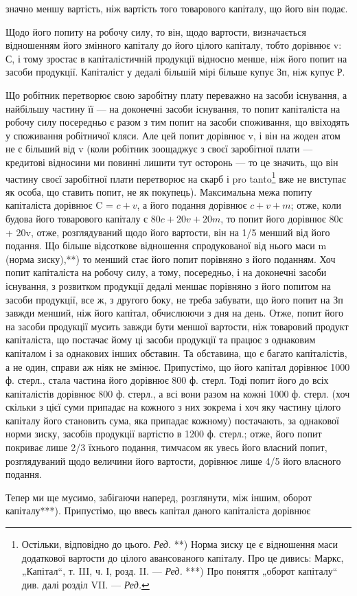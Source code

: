 \parcont{}  %
значно меншу вартість, ніж вартість того товарового капіталу, що
його він подає.

Щодо його попиту на робочу силу, то він, щодо вартости, визначається
відношенням його змінного капіталу до його цілого капіталу,
тобто дорівнює v: С, і тому зростає в капіталістичній продукції
відносно менше, ніж його попит на засоби продукції. Капіталіст
у дедалі більшій мірі більше купує Зп, ніж купує Р.

Що робітник перетворює свою заробітну плату переважно на засоби
існування, а найбільшу частину її — на доконечні засоби існування, то попит
капіталіста на робочу силу посередньо є разом з тим попит на засоби споживання,
що ввіходять у споживання робітничої кляси. Але цей попит
дорівнює v, і він на жоден атом не є більший від v (коли робітник зоощаджує
з своєї заробітної плати — кредитові відносини ми повинні лишити
тут осторонь — то це значить, що він частину своєї заробітної плати
перетворює на скарб і pro tanto\footnote*{
Остільки, відповідно до цього. \emph{Ред.}
**) Норма зиску це є відношення маси додаткової вартости до цілого авансованого
капіталу. Про це дивись: Маркс, „Капітал“, т. III, ч. І, розд. II. —
\emph{Ред.}
***) Про поняття „оборот капіталу“ див. далі розділ VII. — \emph{Ред.}
} вже не виступає як особа, що ставить
попит, не як покупець). Максимальна межа попиту капіталіста дорівнює
C = $c + v$, а його подання дорівнює $c + v + m$; отже, коли будова
його товарового капіталу є $80c + 20v + 20m$, то попит його дорівнює
80с + 20v, отже, розглядуваний щодо його вартости, він на 1/5 менший
від його подання. Що більше відсоткове відношення спродукованої від нього
маси m (норма зиску),**) то менший стає його попит порівняно з його
поданням. Хоч попит капіталіста на робочу силу, а тому, посередньо, і
на доконечні засоби існування, з розвитком продукції дедалі меншає порівняно
з його попитом на засоби продукції, все ж, з другого боку, не
треба забувати, що його попит на Зп завжди менший, ніж його капітал,
обчислюючи з дня на день. Отже, попит його на засоби продукції
мусить завжди бути меншої вартости, ніж товаровий продукт капіталіста,
що постачає йому ці засоби продукції та працює з однаковим
капіталом і за однакових інших обставин. Та обставина, що є
багато капіталістів, а не один, справи аж ніяк не змінює. Припустімо,
що його капітал дорівнює 1000 ф. стерл., стала частина його дорівнює
800 ф. стерл. Тоді попит його до всіх капіталістів дорівнює 800 ф. стерл.,
а всі вони разом на кожні 1000 ф. стерл. (хоч скільки з цієї суми припадає
на кожного з них зокрема і хоч яку частину цілого капіталу його
становить сума, яка припадає кожному) постачають, за однакової норми
зиску, засобів продукції вартістю в 1200 ф. стерл.; отже, його попит покриває
лише 2/3 їхнього подання, тимчасом як увесь його власний попит,
розглядуваний щодо величини його вартости, дорівнює лише 4/5
його власного подання.

Тепер ми ще мусимо, забігаючи наперед, розглянути, між іншим, оборот
капіталу***). Припустімо, що ввесь капітал даного капіталіста дорівнює
\parbreak{}  %
